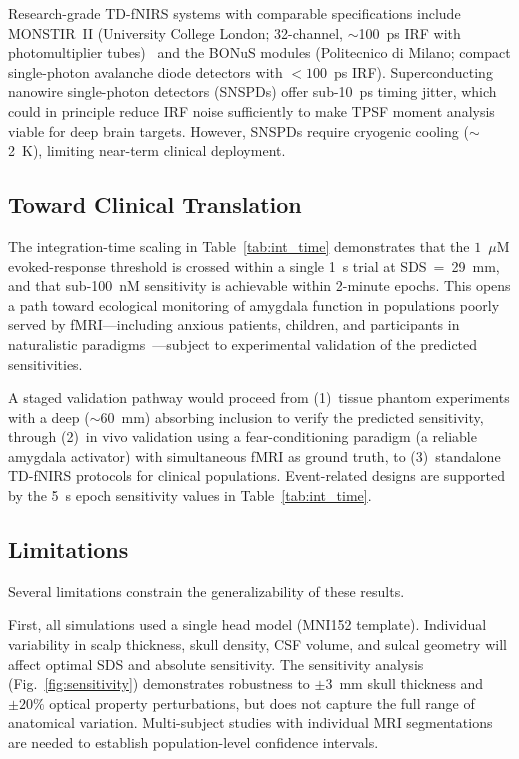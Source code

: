 \documentclass[11pt,a4paper]{article}
\begin{document}
Research-grade TD-fNIRS systems with comparable specifications include MONSTIR~II (University College London; 32-channel, $\sim$100~ps IRF with photomultiplier tubes)~\cite{pifferi2016new} and the BONuS modules (Politecnico di Milano; compact single-photon avalanche diode detectors with $<100$~ps IRF). Superconducting nanowire single-photon detectors (SNSPDs) offer sub-10~ps timing jitter, which could in principle reduce IRF noise sufficiently to make TPSF moment analysis viable for deep brain targets. However, SNSPDs require cryogenic cooling ($\sim$2~K), limiting near-term clinical deployment.

\subsection{Toward Clinical Translation}

The integration-time scaling in Table~\ref{tab:int_time} demonstrates that the $1$~$\mu$M evoked-response threshold is crossed within a single 1~s trial at SDS~=~29~mm, and that sub-100~nM sensitivity is achievable within 2-minute epochs. This opens a path toward ecological monitoring of amygdala function in populations poorly served by fMRI---including anxious patients, children, and participants in naturalistic paradigms~\cite{davis1992role,phelps2004human}---subject to experimental validation of the predicted sensitivities.

A staged validation pathway would proceed from (1)~tissue phantom experiments with a deep ($\sim$60~mm) absorbing inclusion to verify the predicted sensitivity, through (2)~in vivo validation using a fear-conditioning paradigm (a reliable amygdala activator) with simultaneous fMRI as ground truth, to (3)~standalone TD-fNIRS protocols for clinical populations. Event-related designs are supported by the 5~s epoch sensitivity values in Table~\ref{tab:int_time}.

\subsection{Limitations}

Several limitations constrain the generalizability of these results.

First, all simulations used a single head model (MNI152 template). Individual variability in scalp thickness, skull density, CSF volume, and sulcal geometry will affect optimal SDS and absolute sensitivity. The sensitivity analysis (Fig.~\ref{fig:sensitivity}) demonstrates robustness to $\pm 3$~mm skull thickness and $\pm 20\%$ optical property perturbations, but does not capture the full range of anatomical variation. Multi-subject studies with individual MRI segmentations are needed to establish population-level confidence intervals.
\end{document}
